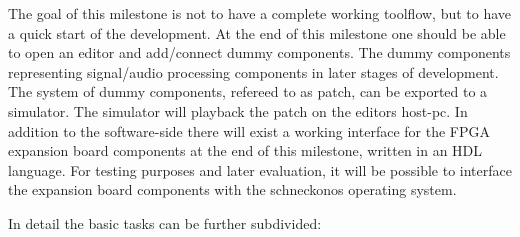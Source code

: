 The goal of this milestone is not to have a complete working toolflow, but to have a quick start of the development. At the end of this milestone one should be able to open an editor and add/connect dummy components. The dummy components representing signal/audio processing components in later stages of development. The system of dummy components, refereed to as patch, can be exported to a simulator. The simulator will playback the patch on the editors host-pc. 
In addition to the software-side there will exist a working interface for the FPGA expansion board components at the end of this milestone, written in an HDL language. For testing purposes and later evaluation, it will be possible to interface the expansion board components with the schneckonos operating system. %

In detail the basic tasks can be further subdivided:

